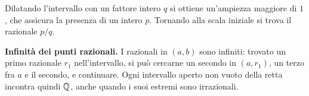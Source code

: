 \begin{schema}
\par\smallskip Dilatando l'intervallo con un fattore intero $q$ si ottiene un'ampiezza maggiore di $1$, che assicura la presenza di un intero $p$. Tornando alla scala iniziale si trova il razionale $p/q$.
\end{schema}

\textbf{Infinità dei punti razionali.} I razionali in $(a,b)$ sono infiniti: trovato un primo razionale $r_1$ nell'intervallo, si può cercarne un secondo in $(a,r_1)$, un terzo fra $a$ e il secondo, e continuare. Ogni intervallo aperto non vuoto della retta incontra quindi $\mathbb{Q}$, anche quando i suoi estremi sono irrazionali.
